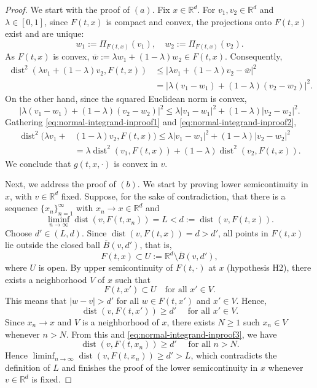 \documentclass[11pt]{elsarticle}
\theoremstyle{definition}
\theoremstyle{remark}
\numberwithin{equation}{section}
\def\dist{\operatorname{dist}}
\begin{document}
	\begin{proof}
		We start with the proof of $(a)$.
		Fix $x \in \mathbb{R}^d$. For $v_1, v_2 \in \mathbb{R}^d$ and $\lambda \in [0,1]$, 
		since $F(t,x)$ is compact and convex, the projections onto $F(t,x)$ exist and are unique:
		\[
		w_1 := \Pi_{F(t,x)} (v_1),  \quad
		w_2 := \Pi_{F(t,x)} (v_2).
		\]
		As $F(t,x)$ is convex, $\overline{w} := \lambda w_1 + (1-\lambda) w_2 \in F(t,x)$. Consequently,
		\begin{align}\label{eq:normal-integrand-inproof1}
			\dist^2(\lambda v_1 + (1-\lambda)v_2, F(t,x)) 
			& \le \big|\lambda v_1 + (1-\lambda)v_2 - \overline{w}\big|^2 
			\nonumber\\ & 
			= \left|\lambda(v_1 - w_1) + (1-\lambda)(v_2 - w_2)\right|^2.
		\end{align}
		On the other hand, since the squared Euclidean norm is convex,
		\begin{equation}\label{eq:normal-integrand-inproof2}
			|\lambda(v_1 - w_1) + (1-\lambda)(v_2 - w_2)|^2 
			\le \lambda |v_1 - w_1|^2 + (1-\lambda) |v_2 - w_2|^2.
		\end{equation}
		Gathering \eqref{eq:normal-integrand-inproof1} and \eqref{eq:normal-integrand-inproof2},
		\begin{align}
			\dist^2(\lambda v_1 + & (1-\lambda)v_2, F(t,x)) 
			\le \lambda |v_1 - w_1|^2 + (1-\lambda)|v_2 - w_2|^2 
			\nonumber\\ &
			= \lambda \dist^2(v_1, F(t,x)) + (1-\lambda) \dist^2(v_2, F(t,x)).
			\nonumber
		\end{align}
		We conclude that $g(t, x, \cdot)$ is convex in $v$.
		
		Next, we address the proof of $(b)$.
		We start by proving lower semicontinuity in $x$, with $v\in \mathbb{R}^d$ fixed.
		Suppose, for the sake of contradiction, that there is a sequence $\{x_n\}_{n=1}^{\infty}$ with $x_n \to x \in \mathbb{R}^d$ and 
		\[
		\liminf_{n \to \infty} \dist(v, F(t, x_n)) = L < d := \dist(v, F(t, x)).
		\]
		Choose $d' \in (L, d)$. Since $\dist(v, F(t,x)) = d > d'$, all points in $F(t,x)$ 
		lie outside the closed ball $\overline{B}(v, d')$, that is,
		\[
		F(t, x) \subset U := \mathbb{R}^d \setminus \overline{B}(v, d'),
		\]
		where $U$ is open.
		By upper semicontinuity of $F(t, \cdot)$ at $x$ (hypothesis H2), 
		there exists a neighborhood $V$ of $x$ such that
		\[
		F(t, x') \subset U \quad \text{for all } x' \in V.
		\]
		This means that $|w - v| > d'$ for all $w \in F(t, x')$ and $x'\in V$. Hence,
		\begin{equation}\label{eq:normal-integrand-inproof3}
			\dist(v, F(t, x')) \ge d' \quad \text{ for all } x'\in V.
		\end{equation}
		Since $x_n \to x$ and $V$ is a neighborhood of $x$, there exists $N\geq 1$ such $x_n \in V$ whenever $n > N$. From this and \eqref{eq:normal-integrand-inproof3}, we have
		\[
		\dist(v, F(t, x_n)) \ge d' \quad \text{ for all } n > N.
		\]
		Hence $\liminf_{n\to\infty}\dist(v, F(t, x_n))\ge d' > L$, which contradicts the definition of $L$ and finishes the proof of the lower semicontinuity in $x$ whenever $v\in\mathbb{R}^d$ is fixed.
		

\end{proof}
\end{document}
